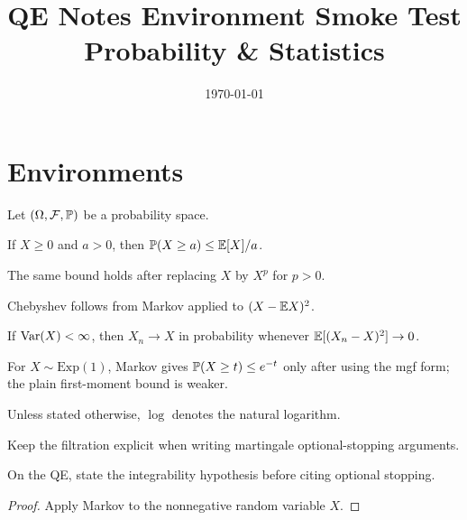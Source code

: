 \documentclass[11pt,a4paper]{article}
\title{\textbf{QE Notes Environment Smoke Test}\\[0.4em]
\large Probability \& Statistics}
\author{}
\date{\today}
\begin{document}
\maketitle

\section{Environments}

\begin{definition}\label{def:sample-space}
Let $(\Omega,\F,\Pbb)$ be a probability space.
\end{definition}

\begin{theorem}\label{thm:markov}
If $X\ge 0$ and $a>0$, then $\Pbb(X\ge a)\le \E[X]/a$.
\end{theorem}

\begin{lemma}
The same bound holds after replacing $X$ by $X^p$ for $p>0$.
\end{lemma}

\begin{proposition}
Chebyshev follows from Markov applied to $(X-\E X)^2$.
\end{proposition}

\begin{corollary}
If $\operatorname{Var}(X)<\infty$, then $X_n\to X$ in probability whenever $\E[(X_n-X)^2]\to 0$.
\end{corollary}

\begin{example}
For $X\sim\mathrm{Exp}(1)$, Markov gives $\Pbb(X\ge t)\le e^{-t}$ only after using the mgf form; the plain first-moment bound is weaker.
\end{example}

\begin{remark}[Convention]
Unless stated otherwise, $\log$ denotes the natural logarithm.
\end{remark}

\begin{note}
Keep the filtration explicit when writing martingale optional-stopping arguments.
\end{note}

\begin{examnote}
On the QE, state the integrability hypothesis before citing optional stopping.
\end{examnote}

\begin{proof}
Apply Markov to the nonnegative random variable $X$.
\end{proof}
\end{document}
